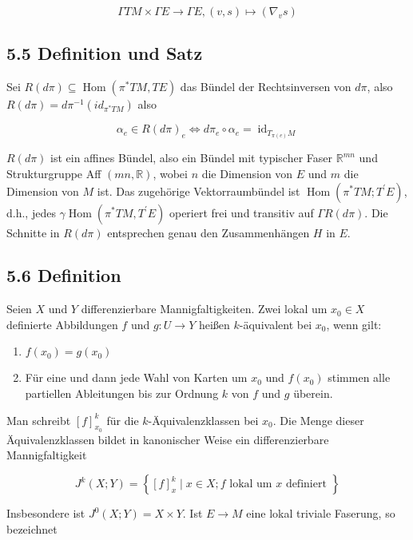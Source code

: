 \documentclass[10pt, letterpaper]{article}
\begin{document}
$$
\Gamma T M \times \Gamma E \rightarrow \Gamma E,(v, s) \mapsto\left(\nabla_{v} s\right)
$$

\subsection*{5.5 Definition und Satz}
Sei $R(d \pi) \subseteq \operatorname{Hom}\left(\pi^{*} T M, T E\right)$ das Bündel der Rechtsinversen von $d \pi$, also $R(d \pi)=d \pi^{-1}\left(i d_{\pi^{*} T M}\right)$ also

$$
\alpha_{e} \in R(d \pi)_{e} \Leftrightarrow d \pi_{e} \circ \alpha_{e}=\operatorname{id}_{T_{\pi(e)} M}
$$

$R(d \pi)$ ist ein affines Bündel, also ein Bündel mit typischer Faser $\mathbb{R}^{m n}$ und Strukturgruppe Aff $(m n, \mathbb{R})$, wobei $n$ die Dimension von $E$ und $m$ die Dimension von $M$ ist. Das zugehörige Vektorraumbündel ist $\operatorname{Hom}\left(\pi^{*} T M ; T^{\prime} E\right)$, d.h., jedes $\gamma \operatorname{Hom}\left(\pi^{*} T M, T^{\prime} E\right)$ operiert frei und transitiv auf $\Gamma R(d \pi)$. Die Schnitte in $R(d \pi)$ entsprechen genau den Zusammenhängen $H$ in $E$.

\subsection*{5.6 Definition}
Seien $X$ und $Y$ differenzierbare Mannigfaltigkeiten. Zwei lokal um $x_{0} \in X$ definierte Abbildungen $f$ und $g: U \rightarrow Y$ heißen $k$-äquivalent bei $x_{0}$, wenn gilt:

\begin{enumerate}
  \item $f\left(x_{0}\right)=g\left(x_{0}\right)$
  \item Für eine und dann jede Wahl von Karten um $x_{0}$ und $f\left(x_{0}\right)$ stimmen alle partiellen Ableitungen bis zur Ordnung $k$ von $f$ und $g$ überein.
\end{enumerate}

Man schreibt $[f]_{x_{0}}^{k}$ für die $k$-Äquivalenzklassen bei $x_{0}$. Die Menge dieser Äquivalenzklassen bildet in kanonischer Weise ein differenzierbare Mannigfaltigkeit

$$
J^{k}(X ; Y)=\left\{[f]_{x}^{k} \mid x \in X ; f \text { lokal um } x \text { definiert }\right\}
$$

Insbesondere ist $J^{0}(X ; Y)=X \times Y$. Ist $E \rightarrow M$ eine lokal triviale Faserung, so bezeichnet
\end{document}
